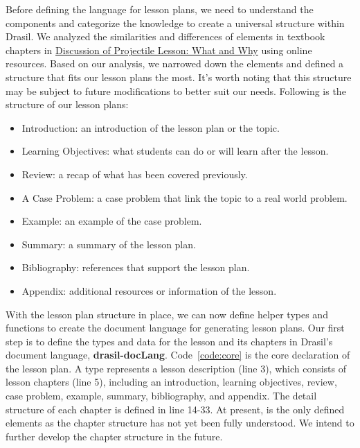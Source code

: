 Before defining the language for lesson plans, we need to understand the 
components and categorize the knowledge to create a universal structure within 
Drasil. We analyzed the similarities and differences of elements in textbook 
chapters in 
\href{https://github.com/smiths/caseStudies/blob/master/CaseStudies/projectile/projectileLesson/AboutProjectileLesson.pdf}{Discussion
 of Projectile Lesson: What and	Why} using online resources. Based on our 
analysis, we narrowed down the elements and defined a structure that fits our 
lesson plans the most. It's worth noting that this structure may be subject to 
future modifications to better suit our needs. Following is the structure of
our lesson plans:
\begin{itemize}
	\item Introduction: an introduction of the lesson plan or the topic.
	\item Learning Objectives: what students can do or will learn after the 
	lesson.  
	\item Review: a recap of what has been covered previously.
	\item A Case Problem: a case problem that link the topic to a real world 
	problem.
	\item Example: an example of the case problem.
	\item Summary: a summary of the lesson plan.
	\item Bibliography: references that support the lesson plan.
	\item Appendix: additional resources or information of the lesson.
\end{itemize}

With the lesson plan structure in place, we can now define helper types and 
functions to create the document language for generating lesson plans. Our 
first step is to define the types and data for the lesson and its chapters in 
Drasil's document language, \textbf{drasil-docLang}. Code~\ref{code:core} is 
the core declaration of the lesson plan. A  type represents a 
lesson description (line 3), which consists of lesson chapters (line 5), 
including an introduction, learning objectives, review, case problem, example, 
summary, bibliography, and appendix. The detail structure of each chapter is 
defined in line 14-33. At present,  is the only defined 
elements as the chapter structure has not yet been fully understood. We intend 
to further develop the chapter structure in the future.  

